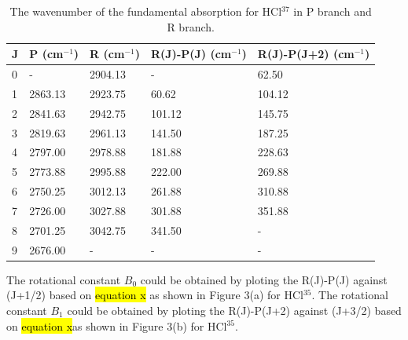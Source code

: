 \documentclass[twocolumn]{article} %
\begin{document}
\begin{table}[h]
    \caption{The wavenumber of the fundamental absorption for HCl$^{37}$ in P branch and R branch.}
    \begin{tabular}{L{.1in}C{.7in}C{.7in}C{.7in}C{.8in}}\toprule
        J & P (cm$^{-1}$)      & R     (cm$^{-1}$)  & R(J)-P(J) (cm$^{-1}$)& R(J)-P(J+2) (cm$^{-1}$)\\ & - & 2904.13 &       -   & 62.50       \\
        1 & 2863.13 & 2923.75 & 60.62     & 104.12      \\
        2 & 2841.63 & 2942.75 & 101.12    & 145.75      \\
        3 & 2819.63 & 2961.13 & 141.50    & 187.25      \\
        4 & 2797.00 & 2978.88 & 181.88    & 228.63      \\
        5 & 2773.88 & 2995.88 & 222.00    & 269.88      \\
        6 & 2750.25 & 3012.13 & 261.88    & 310.88      \\
        7 & 2726.00 & 3027.88 & 301.88    & 351.88      \\
        8 & 2701.25 & 3042.75 & 341.50    &    -    \\
        9 & 2676.00 &     -   &    -      &    - \\\bottomrule
    \end{tabular}
\end{table}

The rotational constant $B_0$ could be obtained by ploting the R(J)-P(J) against (J+1/2) based on \hl{equation x} as shown in Figure 3(a) for HCl$^{35}$. The rotational constant $B_1$ could be obtained by ploting the R(J)-P(J+2) against (J+3/2) based on \hl{equation x}as shown in Figure 3(b) for HCl$^{35}$.
\end{document}
